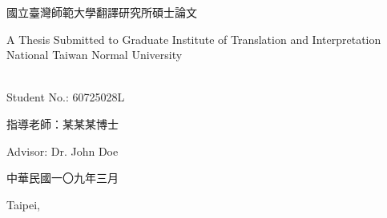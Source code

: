 \makeatletter
\begin{titlepage}%
  \begin{center}%
    {\large 國立臺灣師範大學翻譯研究所碩士論文\par}

    {\large A Thesis Submitted to Graduate Institute of Translation and Interpretation National Taiwan Normal University\par}
    \par
  \end{center}%
  \vspace{1cm plus 1fill}
  \begin{flushleft}%
    {{\Large\bfseries \@author}\\
      Student No.: 60725028L\par}
  \end{flushleft}%
  \vspace{8mm plus 1mm minus 2mm}
  \begin{center}%
    {\Large\textbf{\titlezh}\par}\par
    \vspace{1em}
    {\huge\textbf{\@title}\par}
    \vspace{2cm plus 1.5fill}
    {\large 指導老師：某某某博士}\par
    \vspace{0.5em}
    {\large Advisor: Dr. John Doe}\par
    \vspace{2cm}
    {\large 中華民國一〇九年三月}\par
    \vspace{0.5em}
    {\large Taipei, \@date}
  \end{center}
\end{titlepage}%
\makeatother